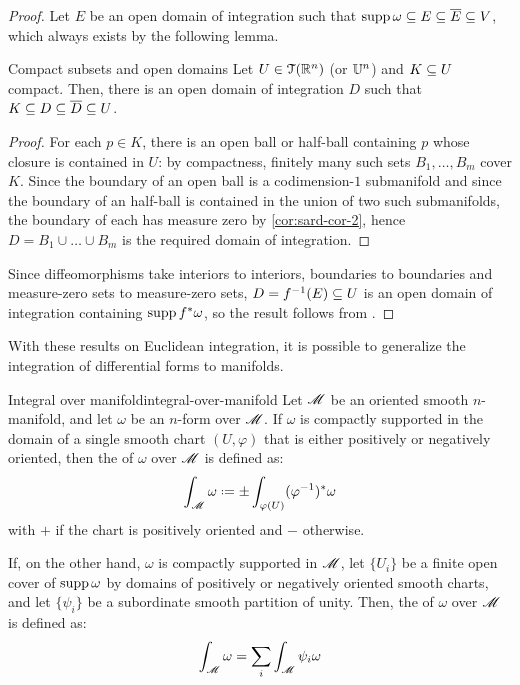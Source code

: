 \begin{proofbox}
  \begin{proof}
    Let $ E $ be an open domain of integration such that $ \operatorname{supp} \omega \subseteq E \subseteq \overline{E} \subseteq V $, which always exists by the following lemma.

    \begin{lemma}{Compact subsets and open domains}{}
      Let $ U \in \EuScript{T}(\mathbb{R}^n) $ (or $ \mathbb{U}^n $) and $ K \subseteq U $ compact. Then, there is an open domain of integration $ D $ such that $ K \subseteq D \subseteq \overline{D} \subseteq U $.
    \end{lemma}

    \begin{proofbox}
      \begin{proof}
        For each $ p \in K $, there is an open ball or half-ball containing $ p $ whose closure is contained in $ U $: by compactness, finitely many such sets $ B_1 , \dots , B_m $ cover $ K $. Since the boundary of an open ball is a codimension-$ 1 $ submanifold and since the boundary of an half-ball is contained in the union of two such submanifolds, the boundary of each has measure zero by \cref{cor:sard-cor-2}, hence $ D = B_1 \cup \dots \cup B_m $ is the required domain of integration.
      \end{proof}
    \end{proofbox}

    Since diffeomorphisms take interiors to interiors, boundaries to boundaries and measure-zero sets to measure-zero sets, $ D = f^{-1}(E) \subseteq U $ is an open domain of integration containing $ \operatorname{supp} f^* \omega $, so the result follows from .
  \end{proof}
\end{proofbox}

With these results on Euclidean integration, it is possible to generalize the integration of differential forms to manifolds.

\begin{definition}{Integral over manifold}{integral-over-manifold}
  Let $ \mathscr{M} $ be an oriented smooth $ n $-manifold, and let $ \omega $ be an $ n $-form over $ \mathscr{M} $. If $ \omega $ is compactly supported in the domain of a single smooth chart $ (U,\varphi) $ that is either positively or negatively oriented, then the  of $ \omega $ over $ \mathscr{M} $ is defined as:
  \begin{equation}
    \int_\man \omega \defeq \pm \int_{\varphi(U)} (\varphi^{-1})^* \omega
  \end{equation}
  with $ + $ if the chart is positively oriented and $ - $ otherwise.

  If, on the other hand, $ \omega $ is compactly supported in $ \mathscr{M} $, let $ \{U_i\} $ be a finite open cover of $ \operatorname{supp} \omega $ by domains of positively or negatively oriented smooth charts, and let $ \{\psi_i\} $ be a subordinate smooth partition of unity. Then, the  of $ \omega $ over $ \mathscr{M} $ is defined as:
  \begin{equation}
    \int_\mathscr{M} \omega = \sum_i \int_\mathscr{M} \psi_i \omega
    \label{eq:integration-manifold-pou}
  \end{equation}
\end{definition}


